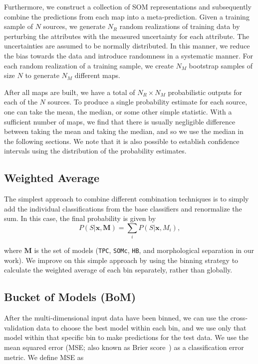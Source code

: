 \documentclass[useAMS,usenatbib]{mn2e}
\begin{document}
Furthermore, we construct a collection of SOM representations
and subsequently combine the predictions from each map
into a meta-prediction.
Given a training sample of $N$ sources,
we generate $N_R$ random realizations of training data
by perturbing the attributes
with the measured uncertainty for each attribute.
The uncertainties are assumed to be normally distributed.
In this manner,
we reduce the bias towards the data
and introduce randomness in a systematic manner.
For each random realization of a training sample,
we create $N_M$ bootstrap samples of size $N$
to generate $N_M$ different maps.

After all maps are built,
we have a total of $N_R \times N_M$ probabilistic outputs
for each of the $N$ sources.
To produce a single probability estimate for each source,
one can take the mean, the median, or some other simple statistic.
With a sufficient number of maps,
we find that there is usually negligible difference
between taking the mean and taking the median,
and so we use the median in the following sections.
We note that it is also possible to establish confidence intervals
using the distribution of the probability estimates.

\subsection{Weighted Average}

The simplest approach to combine different combination techniques is
to simply add the individual classifications from the base classifiers
and renormalize the sum.
In this case, the final probability is given by
\begin{equation}
P\left(S | \mathbf{x}, \mathbf{M} \right)
= \sum_{i} P \left( S | \mathbf{x}, M_{i} \right),
\end{equation}

\noindent
where $\mathbf{M}$ is the set of models
(\texttt{TPC}, \texttt{SOMc}, \texttt{HB}, and morphological separation
in our work).
We improve on this simple approach
by using the binning strategy to
calculate the weighted average of each bin separately,
rather than globally.


\subsection{Bucket of Models (BoM)}

After the multi-dimensional input data have been binned,
we can use the cross-validation data
to choose the best model within each bin,
and we use only that model within that specific bin
to make predictions for the test data.
We use the mean squared error
(MSE; also known as Brier score~\citep{brier1950verification})
as a classification error metric. We define MSE as
\end{document}
